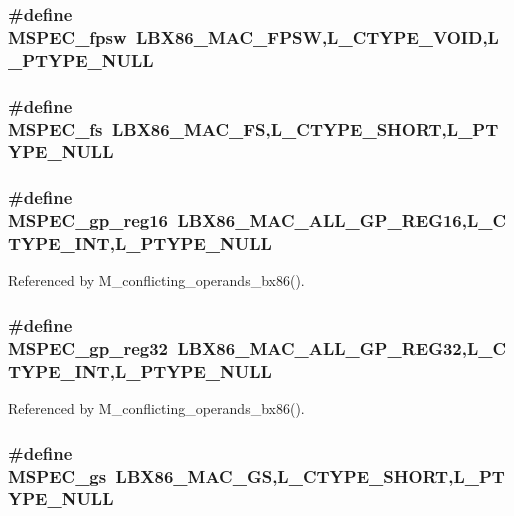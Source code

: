 \subsubsection{\setlength{\rightskip}{0pt plus 5cm}\#define MSPEC\_\-fpsw~LBX86\_\-MAC\_\-FPSW,L\_\-CTYPE\_\-VOID,L\_\-PTYPE\_\-NULL}\label{ml__bx86_8c_47a8d9660290dca85b66fd14319122ef}


\subsubsection{\setlength{\rightskip}{0pt plus 5cm}\#define MSPEC\_\-fs~LBX86\_\-MAC\_\-FS,L\_\-CTYPE\_\-SHORT,L\_\-PTYPE\_\-NULL}\label{ml__bx86_8c_d7fc19c7d7f8f00a5f382d7985bbd48f}


\subsubsection{\setlength{\rightskip}{0pt plus 5cm}\#define MSPEC\_\-gp\_\-reg16~LBX86\_\-MAC\_\-ALL\_\-GP\_\-REG16,L\_\-CTYPE\_\-INT,L\_\-PTYPE\_\-NULL}\label{ml__bx86_8c_5641e4236faf7032b1ae30fc4f8dd3d6}




Referenced by M\_\-conflicting\_\-operands\_\-bx86().
\subsubsection{\setlength{\rightskip}{0pt plus 5cm}\#define MSPEC\_\-gp\_\-reg32~LBX86\_\-MAC\_\-ALL\_\-GP\_\-REG32,L\_\-CTYPE\_\-INT,L\_\-PTYPE\_\-NULL}\label{ml__bx86_8c_555dbbc14ca48ec4bab1e6727049f425}




Referenced by M\_\-conflicting\_\-operands\_\-bx86().
\subsubsection{\setlength{\rightskip}{0pt plus 5cm}\#define MSPEC\_\-gs~LBX86\_\-MAC\_\-GS,L\_\-CTYPE\_\-SHORT,L\_\-PTYPE\_\-NULL}\label{ml__bx86_8c_9425b3c5e086ade1b1054e397a933bf3}



